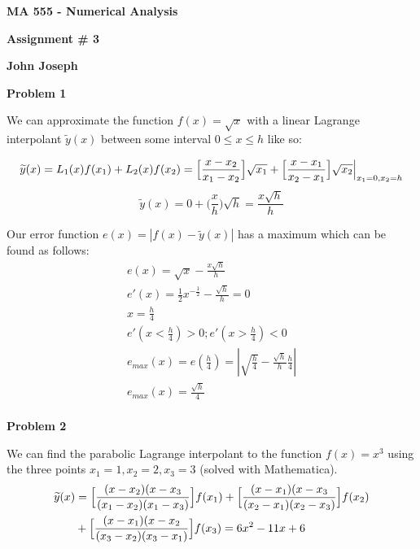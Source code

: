 \documentclass[a4paper,12pt]{article}
\begin{document}
\begin{center}

{\Large\bf MA 555 - Numerical Analysis}

\bigskip

{\large\bf Assignment \# 3}
\smallskip

{\large\bf John Joseph}
\end{center}

{\bf Problem 1}
\smallskip

We can approximate the function $f(x)=\sqrt{x}$ with a linear Lagrange interpolant $\widetilde{y}(x)$ between some interval $0 \leq x \leq h$ like so:

\begin{equation*}
\widetilde{y}(x) = L_1(x)f(x_1)+L_2(x)f(x_2)
= \Big{[} \frac{x-x_2}{x_1-x_2} \Big{]} \sqrt{x_1} + \Big{[} \frac{x-x_1}{x_2-x_1} \Big{]} \sqrt{x_2} \Big{|}_{x_1=0,x_2=h} 
\end{equation*}
\begin{equation*}
\widetilde{y}(x) = 0+ \big(\frac{x}{h} \big) \sqrt{h} = \frac{x \sqrt{h}}{h}
\end{equation*}

Our error function $e(x)=|f(x)-\widetilde{y}(x)|$ has a maximum which can be found as follows:
\begin{eqnarray*}
e(x)=\sqrt{x}- \frac{x \sqrt{h}}{h}\\
e'(x)=\frac{1}{2}x^{-\frac{1}{2}}-\frac{\sqrt{h}}{h}=0\\
x=\frac{h}{4}\\
e'(x < \frac{h}{4}) > 0; 
e'(x > \frac{h}{4}) < 0\\
e_{max}(x)=e(\frac{h}{4})=|\sqrt{\frac{h}{4}}-\frac{\sqrt{h}}{h} \frac{h}{4}| \\
e_{max}(x)=\frac{\sqrt{h}}{4} \\
\end{eqnarray*}

{\bf Problem 2}
\smallskip

We can find the parabolic Lagrange interpolant to the function $f(x)=x^3$ using the three points $x_1=1,x_2=2,x_3=3$ (solved with Mathematica). 
\begin{equation*}
\begin{split}
\widetilde{y}(x) &=\Big{[} \frac{(x-x_2)(x-x_3}{(x_1-x_2)(x_1-x_3)} \Big{]}f(x_1)+\Big{[} \frac{(x-x_1)(x-x_3}{(x_2-x_1)(x_2-x_3)} \Big{]}f(x_2) \\ 
 &+\Big{[} \frac{(x-x_1)(x-x_2}{(x_3-x_2)(x_3-x_1)} \Big{]}f(x_3) = 6x^2-11x+6
\end{split}
\end{equation*}
\end{document}
